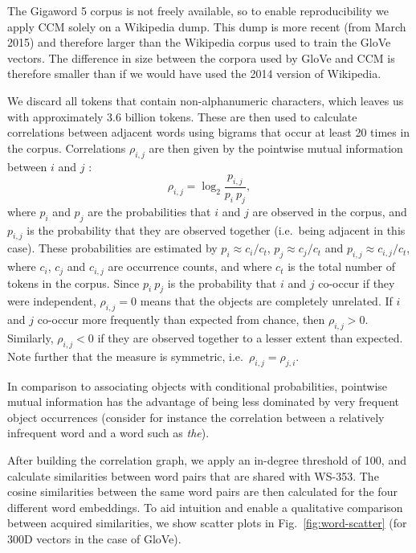 \documentclass{kais}
\newcommand{\rn}[1]{\rho_{#1}}
\begin{document}
The Gigaword 5 corpus is not freely available, so to enable reproducibility we apply CCM solely on a Wikipedia dump. 
This dump is more recent (from March 2015) and therefore larger than the Wikipedia corpus used to train the GloVe vectors.
The difference in size between the corpora used by GloVe and CCM is therefore smaller than if we would have used the
2014 version of Wikipedia.

We discard all tokens that contain non-alphanumeric characters, which leaves us with approximately 3.6 billion 
tokens. These are then used to calculate correlations 
between adjacent words using bigrams that occur at least 20 times in the corpus. 
Correlations $\rn{i,j}$ are then given by the pointwise mutual information between $i$ and $j$ \cite{Church90}:
\begin{equation}
\rn{i,j} = \log_2 \frac{p_{i,j}}{p_i\ p_j},
\end{equation}
where $p_i$ and $p_j$ are the probabilities that $i$ and $j$ are observed in the corpus, and $p_{i,j}$ is the probability
that they are observed together (i.e.\ being adjacent in this case). 
These probabilities are estimated by $p_i \approx c_i / c_{t}$, $p_j \approx c_j / c_{t}$ and
$p_{i,j} \approx c_{i,j} / c_{t}$, where $c_i$, $c_j$ and $c_{i,j}$ are occurrence counts, and where $c_{t}$ is the total number
of tokens in the corpus. Since $p_i\ p_j$ is the probability that $i$ and $j$ co-occur if they were independent, 
$\rn{i,j} = 0$ means that the objects are completely unrelated. If 
$i$ and $j$ co-occur more frequently than expected from chance, then $\rn{i,j} > 0$. Similarly, $\rn{i,j} < 0$ if they 
are observed together to a lesser extent than expected. Note further that the measure is symmetric, i.e.~$\rn{i,j} = \rn{j,i}$.

In comparison to associating objects with conditional probabilities,
pointwise mutual information has the advantage of being less dominated by very frequent object occurrences (consider for
instance the correlation between a relatively infrequent word and a word such as \emph{the}).

After building the correlation graph, we apply an in-degree threshold of 100, and calculate similarities
between word pairs that are shared with WS-353. The cosine similarities between the same word pairs
are then calculated for the four different word embeddings. To aid intuition and enable a qualitative comparison 
between acquired similarities, we show scatter plots in Fig.\ \ref{fig:word-scatter} (for 300D vectors in the case of GloVe).
\end{document}
